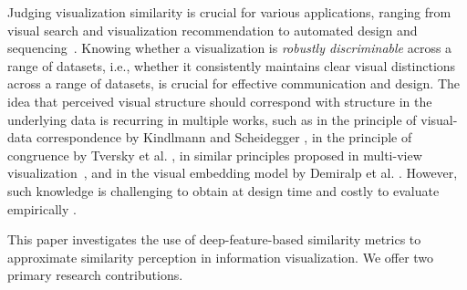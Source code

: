 \documentclass[sigconf]{acmart}
\begin{document}
Judging visualization similarity is crucial for various applications, ranging from visual search \cite{wolfe2020visual} and visualization recommendation \cite{zeng2021evaluation} to automated design and sequencing~\cite{demiralp2014learning, chen2023does}.
Knowing whether a visualization is \textit{robustly discriminable} across a range of datasets, i.e., whether it consistently maintains clear visual distinctions across a range of datasets, is crucial for effective communication and design. The idea that perceived visual structure should correspond with structure in the underlying data is recurring in multiple works, such as in the principle of visual-data correspondence by Kindlmann and Scheidegger \cite{kindlmann2014algebraic}, in the principle of congruence by Tversky et al. \cite{tversky1977features}, in similar principles proposed in multi-view visualization~\cite{qu2016evaluating,qu2017keeping}, and in the visual embedding model by Demiralp et al. \cite{demiralpVisualEmbeddingModel2014}. 
However, such knowledge is challenging to obtain at design time and costly to evaluate empirically \cite{veras2019discriminability}. 

This paper investigates the use of deep-feature-based similarity metrics to approximate similarity perception in information visualization. 
We offer two primary research contributions.
\end{document}
